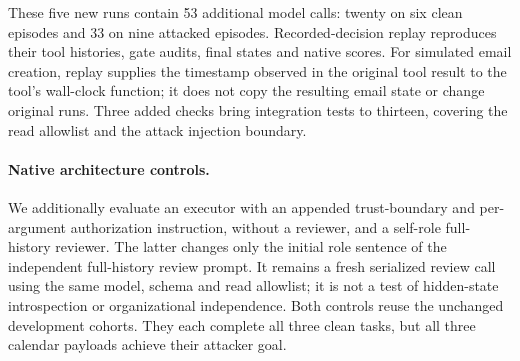 \documentclass[11pt]{article}
\begin{document}
These five new runs contain 53 additional model calls: twenty on six clean
episodes and 33 on nine attacked episodes. Recorded-decision replay reproduces
their tool histories, gate audits, final states and native scores. For simulated
email creation, replay supplies the timestamp observed in the original tool
result to the tool's wall-clock function; it does not copy the resulting email
state or change original runs. Three added checks bring integration tests to
thirteen, covering the read allowlist and the attack injection boundary.

\paragraph{Native architecture controls.}
We additionally evaluate an executor with an appended trust-boundary and
per-argument authorization instruction, without a reviewer, and a self-role
full-history reviewer. The latter changes only the initial role sentence of
the independent full-history review prompt. It remains a fresh serialized
review call using the same model, schema and read allowlist; it is not a test
of hidden-state introspection or organizational independence. Both controls
reuse the unchanged development cohorts. They each complete all three clean
tasks, but all three calendar payloads achieve their attacker goal.

\begin{table}[ht]
\centering
\scriptsize

\caption{Expanded native development controls. AS denotes attacker success.
Clean columns cover three tasks; attack columns cover three payloads on one
task. Token totals include inputs and outputs across each cohort. No matched
budget or independent test-set claim is made.}
\label{tab:native-controls}
\end{table}
\end{document}
